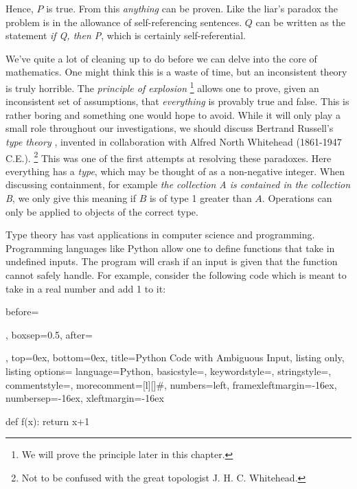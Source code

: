         Hence, $P$ is true. From this \textit{anything} can be proven. Like the
        liar's paradox the problem is in the allowance of self-referencing
        sentences. $Q$ can be written as the statement \textit{if Q, then P},
        which is certainly self-referential.
        \par\hfill\par
        We've quite a lot of cleaning up to do before we can delve into the core
        of mathematics. One might think this is a waste of time, but an
        inconsistent theory is truly horrible. The
        \textit{principle of explosion}%
        \footnote{We will prove the principle later in this chapter.}
        allows one to prove, given an inconsistent set of assumptions, that
        \textit{everything} is provably true and false. This is rather boring
        and something one would hope to avoid. While it will only play a small
        role throughout our investigations, we should discuss Bertrand
        Russell's \textit{type theory}%
        , invented in collaboration with
        Alfred North Whitehead
        (1861-1947 C.E.).%
        \footnote{%
            Not to be confused with the great topologist J. H. C. Whitehead.
        }
        This was one of the first attempts at resolving these paradoxes. Here
        everything has a \textit{type}, which may be thought of as a
        non-negative integer. When discussing containment, for example
        \textit{the collection A is contained in the collection B}, we only
        give this meaning if $B$ is of type 1 greater than $A$. Operations can
        only be applied to objects of the correct type.
        \par\hfill\par
        Type theory has vast applications in computer science and programming.
        Programming languages like Python allow one to define
        functions that take in undefined inputs. The program will crash if an
        input is given that the function cannot safely handle. For example,
        consider the following code which is meant to take in a real number and
        add 1 to it:
        \par
        \begin{tcblisting}{
            before=\par\vspace{2ex},
            boxsep=0.5\topsep,
            after=\par\vspace{2ex},
            top=0ex,
            bottom=0ex,
            title=Python Code with Ambiguous Input,
            listing only,
            listing options={
                language=Python,
                basicstyle=\ttfamily,
                keywordstyle=\color{blue}\ttfamily,
                stringstyle=\color{red}\ttfamily,
                commentstyle=\color{green}\ttfamily,
                morecomment={[l][\color{magenta}]{\#}},
                numbers=left,
                framexleftmargin=-16ex,
                numbersep=-16ex,
                xleftmargin=-16ex
            }
        }
            def f(x):
                return x+1
        \end{tcblisting}
